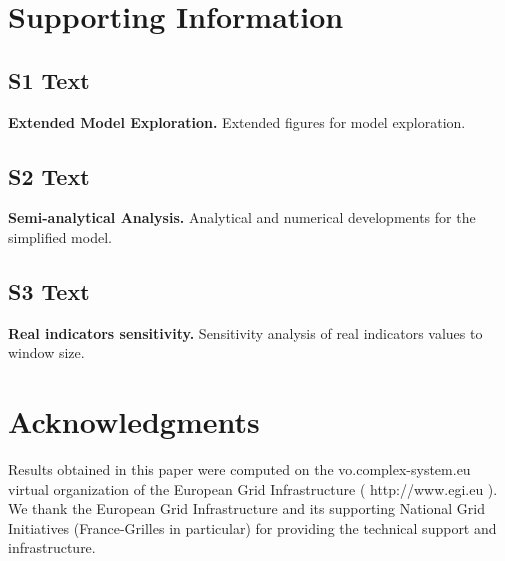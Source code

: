 \documentclass[10pt,letterpaper]{article}
\begin{document}
\section*{Supporting Information}



\subsection*{S1 Text}
\label{S1_Text}
{\bf Extended Model Exploration.} Extended figures for model exploration.

\subsection*{S2 Text}
\label{S2_Text}
{\bf Semi-analytical Analysis.} Analytical and numerical developments for the simplified model.

\subsection*{S3 Text}
\label{S3_Text}
{\bf Real indicators sensitivity.} Sensitivity analysis of real indicators values to window size.



\section*{Acknowledgments}

Results obtained in this paper were computed on the vo.complex-system.eu virtual organization of the European Grid Infrastructure ( http://www.egi.eu ). We thank the European Grid Infrastructure and its supporting National Grid Initiatives (France-Grilles in particular) for providing the technical support and infrastructure.



\nolinenumbers

%
%
% 
\end{document}
